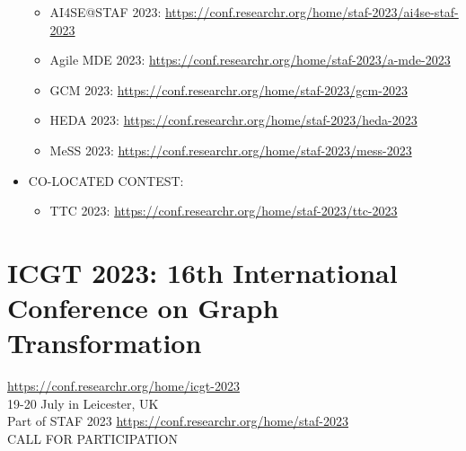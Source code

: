 \documentclass[prodmode,acmtecs]{acmsmall} %
\begin{document}
\begin{itemize}
\begin{itemize}\item  AI4SE@STAF 2023: \href{https://conf.researchr.org/home/staf-2023/ai4se-staf-2023}{https://conf.researchr.org/home/staf-2023/ai4se-staf-2023}
\item  Agile MDE 2023: \href{https://conf.researchr.org/home/staf-2023/a-mde-2023}{https://conf.researchr.org/home/staf-2023/a-mde-2023}
\item  GCM 2023: \href{https://conf.researchr.org/home/staf-2023/gcm-2023}{https://conf.researchr.org/home/staf-2023/gcm-2023}
\item  HEDA 2023: \href{https://conf.researchr.org/home/staf-2023/heda-2023}{https://conf.researchr.org/home/staf-2023/heda-2023}
\item  MeSS 2023: \href{https://conf.researchr.org/home/staf-2023/mess-2023}{https://conf.researchr.org/home/staf-2023/mess-2023}
\end{itemize} 
\item  CO-LOCATED CONTEST: 
 
\begin{itemize}\item  TTC 2023: \href{https://conf.researchr.org/home/staf-2023/ttc-2023}{https://conf.researchr.org/home/staf-2023/ttc-2023}
\end{itemize} 
\end{itemize}\section{ICGT 2023: 16th International Conference on Graph Transformation}\label{ICGT2023}  \href{https://conf.researchr.org/home/icgt-2023}{https://conf.researchr.org/home/icgt-2023}\\ 
  19-20 July in Leicester, UK \\ 
  Part of STAF 2023 \href{https://conf.researchr.org/home/staf-2023}{https://conf.researchr.org/home/staf-2023}\\ 
CALL FOR PARTICIPATION 
\end{document}
